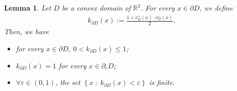 \documentclass[reqno,11pt]{amsart}
\newtheorem{lemma}[theorem]{Lemma}
\theoremstyle{definition}
\numberwithin{equation}{section}
\def\e{\varepsilon}
\newcommand{\RR}{\mathbb{R}}
\newcommand{\1}{{{\bf 1}\kern-0,28em\rm l}}
\def\sepa{\; : \;}
\newcommand{\aco}[1]{\left\{#1\right\}}
\begin{document}
\begin{lemma}\label{access}
Let $D$ be a convex  domain  of $\RR^2$. For every $x\in \partial D$, we define
\begin{align*}
k_{\partial D}(x):= \frac{1+ \nu_D^+(x)\cdot\nu_D^-(x)}{2}.
\end{align*}
Then, we have
\begin{itemize}
\item[(i)] for every $x\in\partial D$, $0<k_{\partial D}(x) \le 1$;
\item[(ii)] $k_{\partial D}(x) = 1$ for every $x\in \partial_r D$;
\item[(iii)] $\forall\e \in(0,1)$, the set  $\aco{x \sepa k_{\partial D}(x) <\e }$ is finite.
\end{itemize}
\end{lemma}
\end{document}
